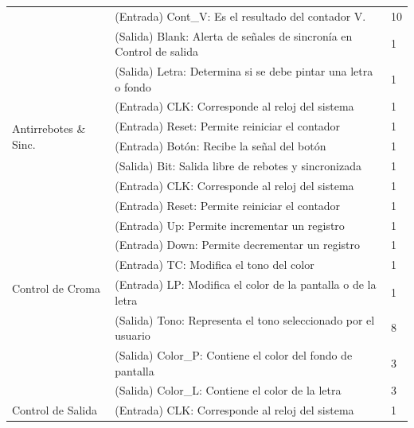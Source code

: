 \documentclass[12pt,a4paper]{article}
\begin{document}
\begin{table}[]
\begin{tabular}{|l|l|l|}
		& (Entrada) Cont\_V: Es el resultado del contador V.                   & 10             \\ \cline{2-3} 
		& (Salida) Blank: Alerta de señales de sincronía en Control de salida  & 1              \\ \cline{2-3} 
		& (Salida) Letra: Determina si se debe pintar una letra o fondo        & 1              \\ \hline
		\multirow{4}{*}{Antirrebotes \& Sinc.}                     & (Entrada) CLK: Corresponde al reloj del sistema                      & 1              \\ \cline{2-3} 
		& (Entrada) Reset: Permite reiniciar el contador                       & 1              \\ \cline{2-3} 
		& (Entrada) Botón: Recibe la señal del botón                           & 1              \\ \cline{2-3} 
		& (Salida) Bit: Salida libre de rebotes y sincronizada                 & 1              \\ \hline
		\multirow{9}{*}{Control de Croma}                          & (Entrada) CLK: Corresponde al reloj del sistema                      & 1              \\ \cline{2-3} 
		& (Entrada) Reset: Permite reiniciar el contador                       & 1              \\ \cline{2-3} 
		& (Entrada) Up: Permite incrementar un registro                        & 1              \\ \cline{2-3} 
		& (Entrada) Down: Permite decrementar un registro                      & 1              \\ \cline{2-3} 
		& (Entrada) TC: Modifica el tono del color                             & 1              \\ \cline{2-3} 
		& (Entrada) LP: Modifica el color de la pantalla o de la letra         & 1              \\ \cline{2-3} 
		& (Salida) Tono: Representa el tono seleccionado por el usuario        & 8              \\ \cline{2-3} 
		& (Salida) Color\_P: Contiene el color del fondo de pantalla           & 3              \\ \cline{2-3} 
		& (Salida) Color\_L: Contiene el color de la letra                     & 3              \\ \hline
		\multirow{9}{*}{Control de Salida}                         & (Entrada) CLK: Corresponde al reloj del sistema                      & 1              \\ \cline{2-3} 

\end{tabular}
\end{table}
\end{document}
